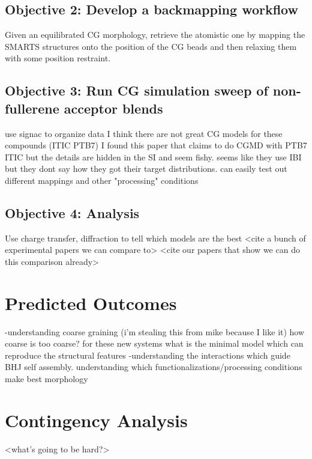 \subsection*{Objective 2: Develop a backmapping workflow}
Given an equilibrated CG morphology, retrieve the atomistic one by mapping the SMARTS structures onto the position of the CG beads and then relaxing them with some position restraint. 

\subsection*{Objective 3: Run CG simulation sweep of non-fullerene acceptor blends}
use signac to organize data
I think there are not great CG models for these compounds (ITIC PTB7) I found this paper \cite{Meng2019} that claims to do CGMD with PTB7 ITIC but the details are hidden in the SI and seem fishy. seems like they use IBI but they dont say how they got their target distributions.
can easily test out different mappings and other "processing" conditions

\subsection*{Objective 4: Analysis}
Use charge transfer, diffraction to tell which models are the best
<cite a bunch of experimental papers we can compare to>
<cite our papers that show we can do this comparison already>

\section*{Predicted Outcomes}
-understanding coarse graining (i'm stealing this from mike because I like it) how coarse is too coarse? for these new systems what is the minimal model which can reproduce the structural features
-understanding the interactions which guide BHJ self assembly. understanding which functionalizations/processing conditions make best morphology

\section*{Contingency Analysis}
<what's going to be hard?>

